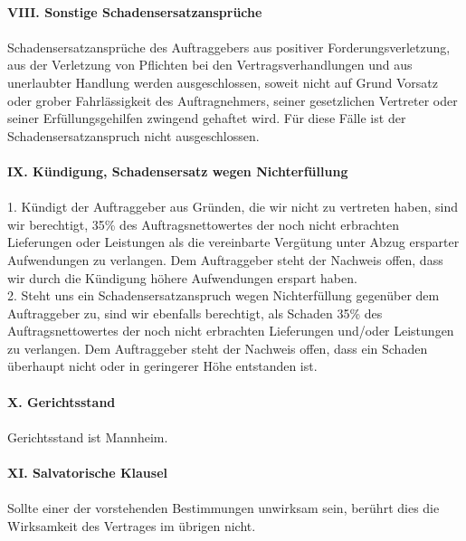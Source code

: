 \documentclass[9pt, oneside]{extletter}
\begin{document}
\begin{multicols}{3}
\\
\textbf{VIII. Sonstige Schadensersatzansprüche}\\
\\
Schadensersatzansprüche des Auftraggebers aus positiver Forderungsverletzung, aus der Verletzung von Pflichten bei den Vertragsverhandlungen und aus unerlaubter Handlung werden ausgeschlossen, soweit nicht auf Grund Vorsatz oder grober Fahrlässigkeit des Auftragnehmers, seiner gesetzlichen Vertreter oder seiner Erfüllungsgehilfen zwingend gehaftet wird. Für diese Fälle ist der Schadensersatzanspruch nicht ausgeschlossen.\\
\\
\textbf{IX. Kündigung, Schadensersatz wegen Nichterfüllung}\\
\\
1. Kündigt der Auftraggeber aus Gründen, die wir nicht zu vertreten haben, sind wir berechtigt, 35\% des Auftragsnettowertes der noch nicht erbrachten Lieferungen oder Leistungen als die vereinbarte Vergütung unter Abzug ersparter Aufwendungen zu verlangen. Dem Auftraggeber steht der Nachweis offen, dass wir durch die Kündigung höhere Aufwendungen erspart haben.\\
2. Steht uns ein Schadensersatzanspruch wegen Nichterfüllung gegenüber dem Auftraggeber zu, sind wir ebenfalls berechtigt, als Schaden 35\% des Auftragsnettowertes der noch nicht erbrachten Lieferungen und/oder Leistungen zu verlangen. Dem Auftraggeber steht der Nachweis offen, dass ein Schaden überhaupt nicht oder in geringerer Höhe entstanden ist.\\
\\
\textbf{X. Gerichtsstand}\\
\\
Gerichtsstand ist Mannheim.\\
\\
\textbf{XI. Salvatorische Klausel}\\
\\
Sollte einer der vorstehenden Bestimmungen unwirksam sein, berührt dies die Wirksamkeit des Vertrages im übrigen nicht.
\end{multicols}
\end{document}
